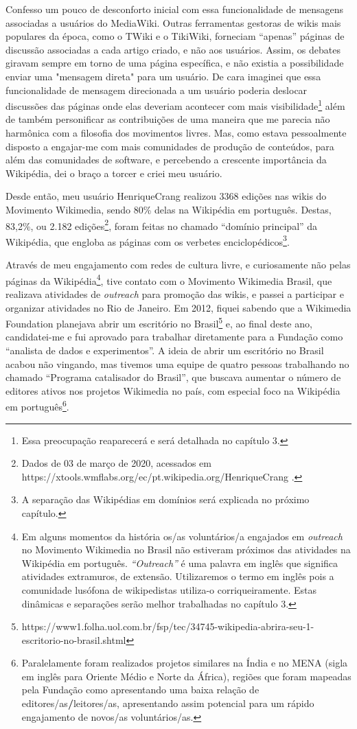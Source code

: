 Confesso um pouco de desconforto inicial com essa funcionalidade de mensagens associadas a usuários do MediaWiki. Outras ferramentas gestoras de wikis mais populares da época, como o TWiki e o TikiWiki, forneciam “apenas” páginas de discussão associadas a cada artigo criado, e não aos usuários. Assim, os debates giravam sempre em torno de uma página específica, e não existia a possibilidade enviar uma "mensagem direta" para um usuário. De cara imaginei que essa funcionalidade de mensagem direcionada a um usuário poderia deslocar discussões das páginas onde elas deveriam acontecer com mais visibilidade\footnote{Essa preocupação reaparecerá e será detalhada no capítulo 3.} além de também personificar as contribuições de uma maneira que me parecia não harmônica com a filosofia dos movimentos livres. Mas, como estava pessoalmente disposto a engajar-me com mais comunidades de produção de conteúdos, para além das comunidades de software, e percebendo a crescente importância da Wikipédia, dei o braço a torcer e criei meu usuário.

Desde então, meu usuário HenriqueCrang realizou 3368 edições nas wikis do Movimento Wikimedia, sendo 80\% delas na Wikipédia em português. Destas, 83,2\%, ou 2.182 edições\footnote{Dados de 03 de março de 2020, acessados em https://xtools.wmflabs.org/ec/pt.wikipedia.org/HenriqueCrang .}, foram feitas no chamado “domínio principal” da Wikipédia, que engloba as páginas com os verbetes enciclopédicos\footnote{A separação das Wikipédias em domínios será explicada no próximo capítulo.}.

Através de meu engajamento com redes de cultura livre, e curiosamente não pelas páginas da Wikipédia\footnote{Em alguns momentos da história os/as voluntários/a engajados em \textit{outreach} no Movimento Wikimedia no Brasil não estiveram próximos das atividades na Wikipédia em português. \textit{``Outreach''} é uma palavra em inglês que significa atividades extramuros, de extensão. Utilizaremos o termo em inglês pois a comunidade lusófona de wikipedistas utiliza-o corriqueiramente. Estas dinâmicas e separações serão melhor trabalhadas no capítulo 3.}, tive contato com o Movimento Wikimedia Brasil, que realizava atividades de \textit{outreach} para promoção das wikis, e passei a participar e organizar atividades no Rio de Janeiro. Em 2012, fiquei sabendo que a Wikimedia Foundation planejava abrir um escritório no Brasil\footnote{https://www1.folha.uol.com.br/fsp/tec/34745-wikipedia-abrira-seu-1-escritorio-no-brasil.shtml} e, ao final deste ano, candidatei-me e fui aprovado para trabalhar diretamente para a Fundação como “analista de dados e experimentos”. A ideia de abrir um escritório no Brasil acabou não vingando, mas tivemos uma equipe de quatro pessoas trabalhando no chamado “Programa catalisador do Brasil”, que buscava aumentar o número de editores ativos nos projetos Wikimedia no país, com especial foco na Wikipédia em português\footnote{Paralelamente foram realizados projetos similares na Índia e no MENA (sigla em inglês para Oriente Médio e Norte da África), regiões que foram mapeadas pela Fundação como apresentando uma baixa relação de editores/as\textbf{/}leitores/as, apresentando assim potencial para um rápido engajamento de novos/as voluntários/as.}.

